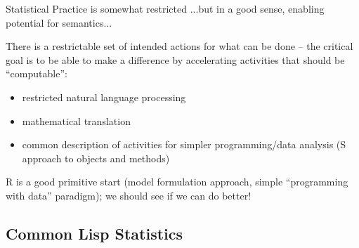 \documentclass{beamer}
\begin{document}
\begin{frame}{Statistical Practice is somewhat restricted}
  {...but in a good sense, enabling potential for semantics...}

  There is a restrictable set of intended actions for what can be done
  -- the critical goal is to be able to make a difference by
  accelerating activities that should be ``computable'':
  \begin{itemize}
  \item restricted natural language processing
  \item mathematical translation
  \item common description of activities for simpler programming/data
    analysis (S approach to objects and methods)
  \end{itemize}
  R is a good primitive start (model formulation approach, simple
  ``programming with data'' paradigm); we should see if we can do
  better!
\end{frame}






\subsection{Common Lisp Statistics}
\end{document}
